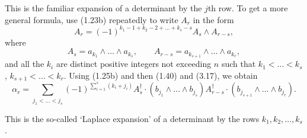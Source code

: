 \documentclass[fleqn]{scrartcl}
\numberwithin{equation}{section}
\begin{document}
\noindent This is the familiar expansion of a determinant by the \(j\)th row. To get a more general formula, use (1.23b) repeatedly to write \(A_r\) in the form
\begin{equation}
A_r = (-1)^{k_1 - 1 + k_2 - 2 + \dots + k_s - s} A_s \wedge A_{r-s}, \tag{4.11a}
\end{equation}
where
\begin{equation}
A_s = a_{k_1} \wedge \dots \wedge a_{k_s}, \qquad A_{r-s} = a_{k_{s+1}} \wedge \dots \wedge a_{k_r}, \tag{4.11b}
\end{equation}
and all the \(k_i\) are distinct positive integers not exceeding \(n\) such that \(k_1 < \dots < k_s\), \(k_{s+1} < \dots < k_r\). Using (1.25b) and then (1.40) and (3.17), we obtain
\begin{equation}
\alpha_r = \sum_{j_1 < \dots < j_s} (-1)^{\sum_{i=1}^s (k_i + j_i)} A_s^{\dagger} \cdot (b_{j_1} \wedge \dots \wedge b_{j_s}) A_{r-s}^{\dagger} \cdot (b_{j_{s+1}} \wedge \dots \wedge b_{j_r}). \tag{4.11c}
\end{equation}

\noindent This is the so-called `Laplace expansion' of a determinant by the rows \(k_1, k_2, \dots, k_s\).
\end{document}
